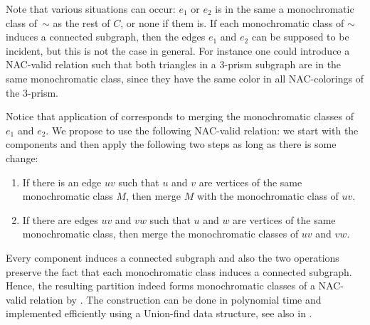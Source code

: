 Note that various situations can occur: $e_1$ or $e_2$ is in the same a monochromatic class of~$\sim$ as the rest of $C$,
or none if them is.
If each monochromatic class of $\sim$ induces a connected subgraph,
then the edges $e_1$ and $e_2$ can be supposed to be incident,
but this is not the case in general.
For instance one could introduce a NAC-valid relation such that both triangles in a 3-prism subgraph
are in the same monochromatic class, since they have the same color in all NAC-colorings of the 3-prism.


Notice that application of  corresponds
to merging the monochromatic classes of $e_1$ and $e_2$.
We propose to use the following NAC-valid relation:
we start with the \trcon{} components and then apply the following two steps
as long as there is some change:
\begin{enumerate}
	\item If there is an edge $uv$ such that $u$ and $v$ are vertices of
	      the same monochromatic class $M$, then merge $M$ with the monochromatic class of $uv$.
	\item If there are edges $uv$ and $vw$ such that $u$ and $w$ are vertices of
	      the same monochromatic class, then merge the monochromatic classes of $uv$ and $vw$.
\end{enumerate}
Every \trcon{} component induces a connected subgraph and also the two operations preserve
the fact that each monochromatic class induces a connected subgraph.
Hence, the resulting partition indeed forms monochromatic classes
of a NAC-valid relation by .
The construction can be done in polynomial time
and implemented efficiently using a Union-find data structure,
see also  in .


